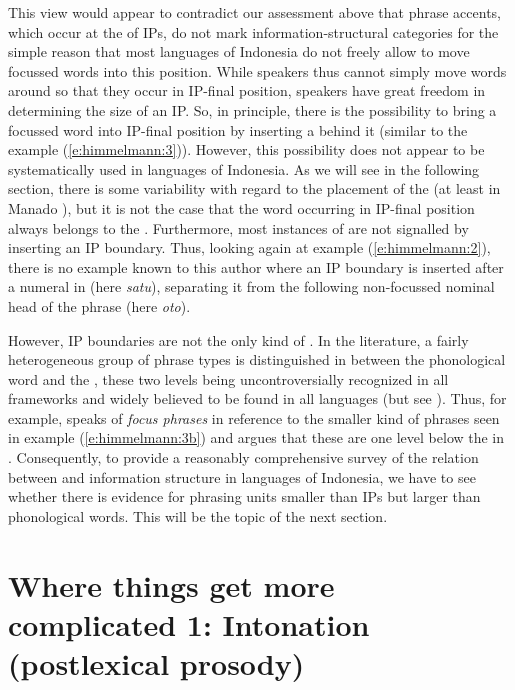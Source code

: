 \documentclass[output=paper
,modfonts
,nonflat]{langsci/langscibook}
\begin{document}
This view would appear to contradict our assessment above that phrase accents, which occur at the  of IPs, do not mark information-structural categories for the simple reason that most  languages of Indonesia do not freely allow to move focussed words into this position. While speakers thus cannot simply move words around so that they occur in IP-final position, speakers have great freedom in determining the size of an IP. So, in principle, there is the possibility to bring a focussed word into IP-final position by inserting a  behind it (similar to the  example (\ref{e:himmelmann:3})). However, this possibility does not appear to be systematically used in  languages of Indonesia. As we will see in the following section, there is some variability with regard to the placement of the  (at least in Manado ), but it is not the case that the word occurring in IP-final position always belongs to the . Furthermore, most instances of  are not signalled by inserting an IP boundary. Thus, looking again at example (\ref{e:himmelmann:2}), there is no example known to this author where an IP boundary is inserted after a numeral in  (here \textit{satu}), separating it from the following non-focussed nominal head of the phrase (here \textit{oto}). 

However, IP boundaries are not the only kind of . In the literature, a fairly heterogeneous group of phrase types is distinguished in between the phonological word and the , these two levels being uncontroversially recognized in all frameworks and widely believed to be found in all languages (but see \citealt{Schiering2010}). Thus, for example, \citet{Kanerva1990} speaks of \textit{focus phrases} in reference to the smaller kind of phrases seen in example (\ref{e:himmelmann:3b}) and argues that these are one level below the  in . Consequently, to provide a reasonably comprehensive survey of the relation between  and information structure in  languages of Indonesia, we have to see whether there is evidence for phrasing units smaller than IPs but larger than phonological words. This will be the topic of the next section.

\section{\label{s:himmelmann:4}Where things get more complicated 1: Intonation (postlexical prosody)}
\end{document}
